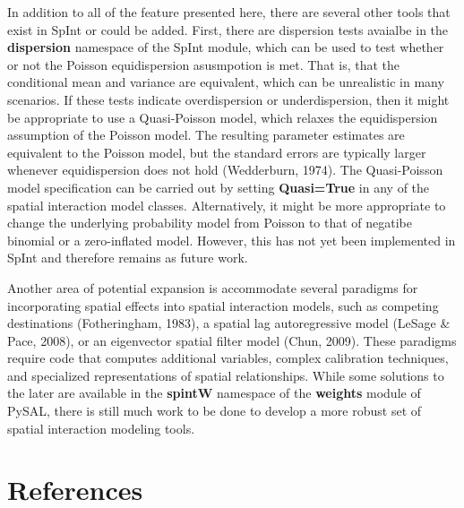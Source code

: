 \documentclass[11pt]{article}
\begin{document}
    In addition to all of the feature presented here, there are several
other tools that exist in SpInt or could be added. First, there are
dispersion tests avaialbe in the \textbf{dispersion} namespace of the
SpInt module, which can be used to test whether or not the Poisson
equidispersion asusmpotion is met. That is, that the conditional mean
and variance are equivalent, which can be unrealistic in many scenarios.
If these tests indicate overdispersion or underdispersion, then it might
be appropriate to use a Quasi-Poisson model, which relaxes the
equidispersion assumption of the Poisson model. The resulting parameter
estimates are equivalent to the Poisson model, but the standard errors
are typically larger whenever equidispersion does not hold (Wedderburn,
1974). The Quasi-Poisson model specification can be carried out by
setting \textbf{Quasi=True} in any of the spatial interaction model
classes. Alternatively, it might be more appropriate to change the
underlying probability model from Poisson to that of negatibe binomial
or a zero-inflated model. However, this has not yet been implemented in
SpInt and therefore remains as future work.

Another area of potential expansion is accommodate several paradigms for
incorporating spatial effects into spatial interaction models, such as
competing destinations (Fotheringham, 1983), a spatial lag
autoregressive model (LeSage \& Pace, 2008), or an eigenvector spatial
filter model (Chun, 2009). These paradigms require code that computes
additional variables, complex calibration techniques, and specialized
representations of spatial relationships. While some solutions to the
later are available in the \textbf{spintW} namespace of the
\textbf{weights} module of PySAL, there is still much work to be done to
develop a more robust set of spatial interaction modeling tools.

    \section*{References}\label{references}
\end{document}
